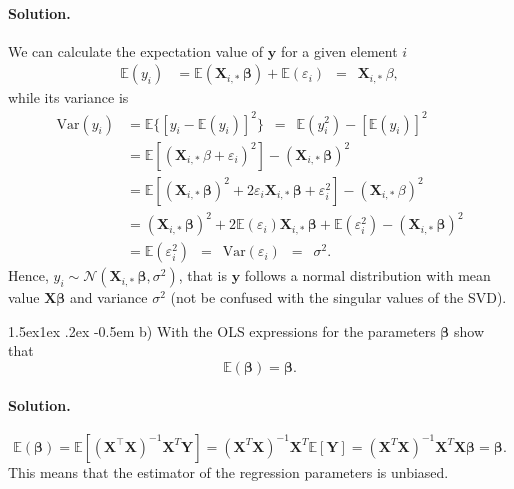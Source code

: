 \documentclass[%
oneside,                 %
final,                   %
10pt]{article}
\makeatletter
\newenvironment{doconceexercise}{}{}
\newcommand\subex{\@startsection{paragraph}{4}{\z@}%
                  {1.5ex\@plus1ex \@minus.2ex}%
                  {-0.5em}%
                  {\normalfont\normalsize\bfseries}}
\makeatother
\begin{document}
\begin{doconceexercise}
\paragraph{Solution.}
We can calculate the expectation value of $\bm{y}$ for a given element $i$ 
\begin{align*} 
\mathbb{E}(y_i) & =
\mathbb{E}(\mathbf{X}_{i, \ast} \, \bm{\beta}) + \mathbb{E}(\varepsilon_i)
\, \, \, = \, \, \, \mathbf{X}_{i, \ast} \, \beta, 
\end{align*} 
while
its variance is 
\begin{align*} \mbox{Var}(y_i) & = \mathbb{E} \{ [y_i
- \mathbb{E}(y_i)]^2 \} \, \, \, = \, \, \, \mathbb{E} ( y_i^2 ) -
[\mathbb{E}(y_i)]^2  \\  & = \mathbb{E} [ ( \mathbf{X}_{i, \ast} \,
\beta + \varepsilon_i )^2] - ( \mathbf{X}_{i, \ast} \, \bm{\beta})^2 \\ &
= \mathbb{E} [ ( \mathbf{X}_{i, \ast} \, \bm{\beta})^2 + 2 \varepsilon_i
\mathbf{X}_{i, \ast} \, \bm{\beta} + \varepsilon_i^2 ] - ( \mathbf{X}_{i,
\ast} \, \beta)^2 \\  & = ( \mathbf{X}_{i, \ast} \, \bm{\beta})^2 + 2
\mathbb{E}(\varepsilon_i) \mathbf{X}_{i, \ast} \, \bm{\beta} +
\mathbb{E}(\varepsilon_i^2 ) - ( \mathbf{X}_{i, \ast} \, \bm{\beta})^2 
\\ & = \mathbb{E}(\varepsilon_i^2 ) \, \, \, = \, \, \,
\mbox{Var}(\varepsilon_i) \, \, \, = \, \, \, \sigma^2.  
\end{align*}
Hence, $y_i \sim \mathcal{N}( \mathbf{X}_{i, \ast} \, \bm{\beta}, \sigma^2)$, that is $\bm{y}$ follows a normal distribution with 
mean value $\bm{X}\bm{\beta}$ and variance $\sigma^2$ (not be confused with the singular values of the SVD).

\subex{b)}
With the OLS expressions for the parameters $\bm{\beta}$ show that
\[
\mathbb{E}(\bm{\beta}) = \bm{\beta}.
\]


\paragraph{Solution.}
\[
\mathbb{E}(\bm{\beta}) = \mathbb{E}[ (\mathbf{X}^{\top} \mathbf{X})^{-1}\mathbf{X}^{T} \mathbf{Y}]=(\mathbf{X}^{T} \mathbf{X})^{-1}\mathbf{X}^{T} \mathbb{E}[ \mathbf{Y}]=(\mathbf{X}^{T} \mathbf{X})^{-1} \mathbf{X}^{T}\mathbf{X}\bm{\beta}=\bm{\beta}.
\]
This means that the estimator of the regression parameters is unbiased.


\end{doconceexercise}
\end{document}
